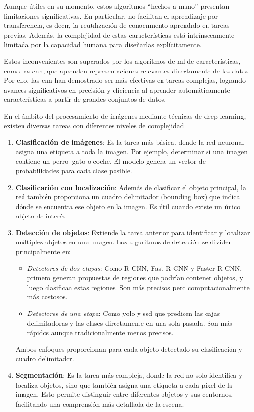 \documentclass[11pt,spanish,listoffigures,listoftables]{tfgetsinf}
\begin{document}
Aunque útiles en su momento, estos algoritmos ``hechos a mano'' presentan limitaciones significativas. En particular, no facilitan el aprendizaje por transferencia, es decir, la reutilización de conocimiento aprendido en tareas previas. Además, la complejidad de estas características está intrínsecamente limitada por la capacidad humana para diseñarlas explícitamente. 

Estos inconvenientes son superados por los algoritmos de \gls{ml} de características, como las \gls{cnn}, que aprenden representaciones relevantes directamente de los datos. Por ello, las \gls{cnn} han demostrado ser más efectivas en tareas complejas, logrando avances significativos en precisión y eficiencia al aprender automáticamente características a partir de grandes conjuntos de datos.



En el ámbito del procesamiento de imágenes mediante técnicas de deep learning, existen diversas tareas con diferentes niveles de complejidad:

\begin{enumerate}
    \item \textbf{Clasificación de imágenes}: Es la tarea más básica, donde la red neuronal asigna una etiqueta a toda la imagen. Por ejemplo, determinar si una imagen contiene un perro, gato o coche. El modelo genera un vector de probabilidades para cada clase posible.
    
    \item \textbf{Clasificación con localización}: Además de clasificar el objeto principal, la red también proporciona un cuadro delimitador (bounding box) que indica dónde se encuentra ese objeto en la imagen. Es útil cuando existe un único objeto de interés.
    
   \item \textbf{Detección de objetos}: Extiende la tarea anterior para identificar y localizar múltiples objetos en una imagen. Los algoritmos de detección se dividen principalmente en:
      \begin{itemize}
         \item \textit{Detectores de dos etapas}: Como R-CNN, Fast R-CNN y Faster R-CNN, primero generan propuestas de regiones que podrían contener objetos, y luego clasifican estas regiones. Son más precisos pero computacionalmente más costosos.
         \item \textit{Detectores de una etapa}: Como \gls{yolo} y \gls{ssd} que predicen las cajas delimitadoras y las clases directamente en una sola pasada. Son más rápidos aunque tradicionalmente menos precisos.
      \end{itemize}
      Ambos enfoques proporcionan para cada objeto detectado su clasificación y cuadro delimitador.
    
    \item \textbf{Segmentación}: Es la tarea más compleja, donde la red no solo identifica y localiza objetos, sino que también asigna una etiqueta a cada píxel de la imagen. Esto permite distinguir entre diferentes objetos y sus contornos, facilitando una comprensión más detallada de la escena.
\end{enumerate}
\end{document}
